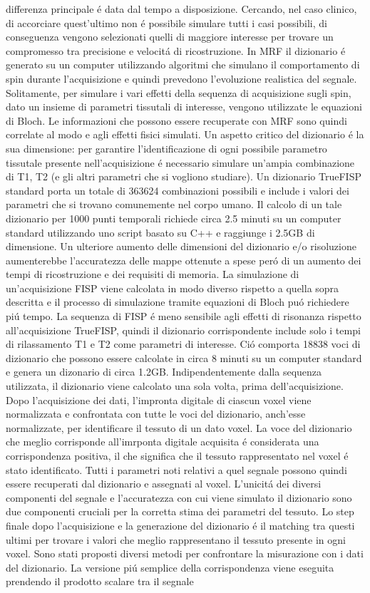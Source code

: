 \documentclass[a4paper,10pt]{article}
\begin{document}
differenza principale \'e data dal tempo a disposizione. Cercando, nel caso clinico, di accorciare quest'ultimo non \'e possibile simulare tutti i casi possibili, di conseguenza vengono selezionati quelli di maggiore interesse per trovare un compromesso tra precisione e velocit\'a di ricostruzione. In MRF il dizionario \'e generato su un computer utilizzando algoritmi che simulano il comportamento di spin durante l'acquisizione e quindi prevedono l'evoluzione realistica del segnale. Solitamente, per simulare i vari effetti della sequenza di acquisizione sugli spin, dato un insieme di parametri tissutali di interesse, vengono utilizzate le equazioni di Bloch. Le informazioni che possono essere recuperate con MRF sono quindi correlate al modo e agli effetti fisici simulati. Un aspetto critico del dizionario \'e la sua dimensione: per garantire l'identificazione di ogni possibile parametro tissutale presente nell'acquisizione \'e necessario simulare un'ampia combinazione di T1, T2 (e gli altri parametri che si vogliono studiare). Un dizionario TrueFISP standard porta un totale di 363624 combinazioni possibili e include i valori dei parametri che si trovano comunemente nel corpo umano. Il calcolo di un tale dizionario per 1000 punti temporali richiede circa 2.5 minuti su un computer standard utilizzando uno script basato su C++ e raggiunge i 2.5GB di dimensione. Un ulteriore aumento delle dimensioni del dizionario e/o risoluzione aumenterebbe l'accuratezza delle mappe ottenute a spese per\'o di un aumento dei tempi di ricostruzione e dei requisiti di memoria. La simulazione di un'acquisizione FISP viene calcolata in modo diverso rispetto a quella sopra descritta e il processo di simulazione tramite equazioni di Bloch pu\'o richiedere pi\'u tempo. La sequenza di FISP \'e meno sensibile agli effetti di risonanza rispetto all'acquisizione TrueFISP, quindi il dizionario corrispondente include solo i tempi di rilassamento T1 e T2 come parametri di interesse. Ci\'o comporta 18838 voci di dizionario che possono essere calcolate in circa 8 minuti su un computer standard e genera un dizonario di circa 1.2GB. Indipendentemente dalla sequenza utilizzata, il dizionario viene calcolato una sola volta, prima dell'acquisizione. Dopo l'acquisizione dei dati, l'impronta digitale di ciascun voxel viene normalizzata e confrontata con tutte le voci del dizionario, anch'esse normalizzate, per identificare il tessuto di un dato voxel. La voce del dizionario che meglio corrisponde all'imrponta digitale acquisita \'e considerata una corrispondenza positiva, il che significa che il tessuto rappresentato nel voxel \'e stato identificato. Tutti i parametri noti relativi a quel segnale possono quindi essere recuperati dal dizionario e assegnati al voxel. L'unicit\'a dei diversi componenti del segnale e l'accuratezza con cui viene simulato il dizionario sono due componenti cruciali per la corretta stima dei parametri del tessuto. Lo step finale dopo l'acquisizione e la generazione del dizionario \'e il matching tra questi ultimi per trovare i valori che meglio rappresentano il tessuto presente in ogni voxel. Sono stati proposti diversi metodi per confrontare la misurazione con i dati del dizionario. La versione pi\'u semplice della corrispondenza viene eseguita prendendo il prodotto scalare tra il segnale 
\end{document}
